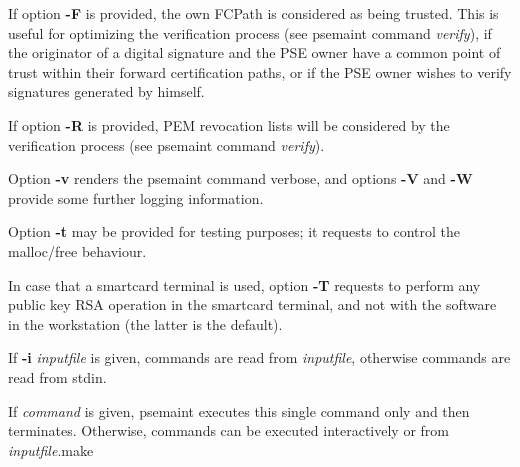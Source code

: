 If option {\bf -F} is provided, the own FCPath is considered as being trusted.
This is useful for optimizing the verification process (see psemaint command {\em verify}),
if the originator of a digital signature and the PSE owner have a common point of trust
within their forward certification paths, or if the PSE owner wishes to verify signatures
generated by himself.

If option {\bf -R} is provided, PEM revocation lists will be considered by the verification process
(see psemaint command {\em verify}).

Option {\bf -v} renders the psemaint command verbose, and options {\bf -V} and {\bf -W} provide some further
logging information. 

Option {\bf -t} may be provided for testing purposes; it requests to control 
the malloc/free behaviour.

In case that a smartcard terminal is used, option {\bf -T} requests to perform any public key 
RSA operation in the smartcard terminal, and not with the software in the workstation 
(the latter is the default).

If {\bf -i} {\em inputfile} is given, commands are read from {\em inputfile}, otherwise
commands are read from stdin.

If {\em command} is given, psemaint executes this single command only and then terminates. 
Otherwise, commands can be executed interactively or from {\em inputfile}.make  

